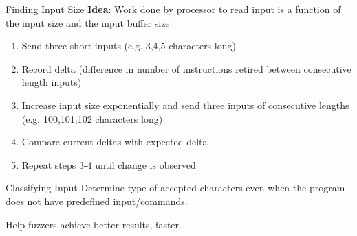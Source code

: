 \documentclass[pdf]{beamer}
\begin{document}
\begin{frame}{Finding Input Size}
\textbf{Idea}: Work done by processor to read input is a function of the input size and the input buffer size
\begin{enumerate}
\item Send three short inputs (e.g. 3,4,5 characters long)
\item Record delta (difference in number of instructions retired between consecutive length inputs)
\item Increase input size exponentially and send three inputs of consecutive lengths (e.g. 100,101,102 characters long)
\item Compare current deltas with expected delta
\item Repeat steps 3-4 until change is observed
\end{enumerate}

\end{frame}
\note{}

\begin{frame}{Classifying Input}
Determine type of accepted characters even when the program does not have predefined input/commands.

\pause
\vspace{\baselineskip}

Help fuzzers achieve better results, faster.

\end{frame}
\end{document}
